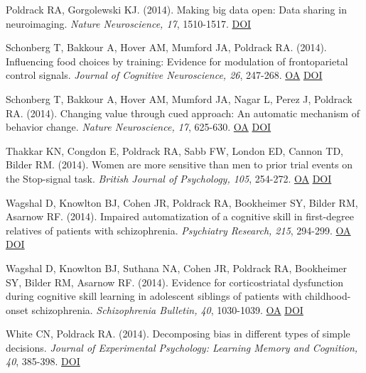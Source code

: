 \documentclass[10pt, letterpaper]{article}
\begin{document}
Poldrack RA, Gorgolewski KJ.  (2014). Making big data open: Data sharing in neuroimaging. \textit{Nature Neuroscience, 17}, 1510-1517. \href{https://doi.org/10.1038/nn.3818}{DOI} \vspace{2mm}

Schonberg T, Bakkour A, Hover AM, Mumford JA, Poldrack RA.  (2014). Influencing food choices by training: Evidence for modulation of frontoparietal control signals. \textit{Journal of Cognitive Neuroscience, 26}, 247-268. \href{https://www.ncbi.nlm.nih.gov/pmc/articles/PMC4066661}{OA} \href{https://doi.org/10.1162/jocn_a_00495}{DOI} \vspace{2mm}

Schonberg T, Bakkour A, Hover AM, Mumford JA, Nagar L, Perez J, Poldrack RA.  (2014). Changing value through cued approach: An automatic mechanism of behavior change. \textit{Nature Neuroscience, 17}, 625-630. \href{https://www.ncbi.nlm.nih.gov/pmc/articles/PMC4041518}{OA} \href{https://doi.org/10.1038/nn.3673}{DOI} \vspace{2mm}

Thakkar KN, Congdon E, Poldrack RA, Sabb FW, London ED, Cannon TD, Bilder RM.  (2014). Women are more sensitive than men to prior trial events on the Stop-signal task. \textit{British Journal of Psychology, 105}, 254-272. \href{https://www.ncbi.nlm.nih.gov/pmc/articles/PMC4000536}{OA} \href{https://doi.org/10.1111/bjop.12034}{DOI} \vspace{2mm}

Wagshal D, Knowlton BJ, Cohen JR, Poldrack RA, Bookheimer SY, Bilder RM, Asarnow RF.  (2014). Impaired automatization of a cognitive skill in first-degree relatives of patients with schizophrenia. \textit{Psychiatry Research, 215}, 294-299. \href{https://www.ncbi.nlm.nih.gov/pmc/articles/PMC4191851}{OA} \href{https://doi.org/10.1016/j.psychres.2013.11.024}{DOI} \vspace{2mm}

Wagshal D, Knowlton BJ, Suthana NA, Cohen JR, Poldrack RA, Bookheimer SY, Bilder RM, Asarnow RF.  (2014). Evidence for corticostriatal dysfunction during cognitive skill learning in adolescent siblings of patients with childhood-onset schizophrenia. \textit{Schizophrenia Bulletin, 40}, 1030-1039. \href{https://www.ncbi.nlm.nih.gov/pmc/articles/PMC4133665}{OA} \href{https://doi.org/10.1093/schbul/sbt147}{DOI} \vspace{2mm}

White CN, Poldrack RA.  (2014). Decomposing bias in different types of simple decisions. \textit{Journal of Experimental Psychology: Learning Memory and Cognition, 40}, 385-398. \href{https://doi.org/10.1037/a0034851}{DOI} \vspace{2mm}
\end{document}
